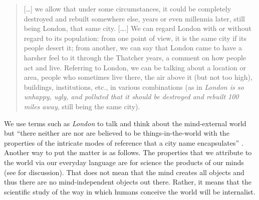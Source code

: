 \begin{quote}
[…] we allow that under some circumstances, it could be completely destroyed and rebuilt somewhere else, years or even millennia later, still being London, that same city. [….] We can regard London with or without regard to its population: from one point of view, it is the same city if its people desert it; from another, we can say that London came to have a harsher feel to it through the Thatcher years, a comment on how people act and live. Referring to London, we can be talking about a location or area, people who sometimes live there, the air above it (but not too high), buildings, institutions, etc., in various combinations (as in \textit{London is so unhappy, ugly, and polluted that it should be destroyed and rebuilt 100 miles away}, still being the same city). \citep[37]{Chomsky2000}
\end{quote}

We use terms such as \textit{London} to talk and think about the mind-external world but “there neither are nor are believed to be things-in-the-world with the properties of the intricate modes of reference that a city name encapsulates” \citep[37]{Chomsky2000}. Another way to put the matter is as follows. The properties that we attribute to the world via our everyday language are for science the products of our minds (see \citealt{McGilvray2002} for discussion). That does not mean that the mind creates all objects and thus there are no mind-independent objects out there. Rather, it means that the scientific study of the way in which humans conceive the world will be internalist. 
	
